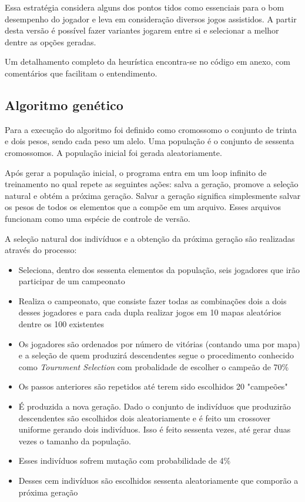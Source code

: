 \documentclass[a4paper,titlepage,11pt]{article}
\begin{document}
Essa estratégia considera alguns dos pontos tidos como essenciais para o bom desempenho do jogador e leva em consideração diversos jogos assistidos. A partir desta versão é possível fazer variantes jogarem entre si e selecionar a melhor dentre as opções geradas.

Um detalhamento completo da heurística encontra-se no código em anexo, com comentários que facilitam o entendimento.

\subsection{Algoritmo genético}
Para a execução do algoritmo foi definido como cromossomo o conjunto de trinta e dois pesos, sendo cada peso um alelo. Uma população é o conjunto de sessenta cromossomos. A população inicial foi gerada aleatoriamente.

Após gerar a população inicial, o programa entra em um loop infinito de treinamento no qual repete as seguintes ações: salva a geração, promove a seleção natural e obtém a próxima geração. Salvar a geração significa simplesmente salvar os pesos de todos os elementos que a compõe em um arquivo. Esses arquivos funcionam como uma espécie de controle de versão.

A seleção natural dos indivíduos e a obtenção da próxima geração são realizadas através do processo:
\begin{itemize}
	\item Seleciona, dentro dos sessenta elementos da população, seis jogadores que irão participar de um campeonato
	\item Realiza o campeonato, que consiste fazer todas as combinações dois a dois desses jogadores e para cada dupla realizar jogos em 10 mapas aleatórios dentre os 100 existentes 
	\item Os jogadores são ordenados por número de vitórias (contando uma por mapa) e a seleção de quem produzirá descendentes segue o procedimento conhecido como {\em Tournment Selection} com probalidade de escolher o campeão de 70\%
	\item Os passos anteriores são repetidos até terem sido escolhidos 20 "campeões"
	\item É produzida a nova geração. Dado o conjunto de indivíduos que produzirão descendentes são escolhidos dois aleatoriamente e é feito um crossover uniforme gerando dois indivíduos. Isso é feito sessenta vezes, até gerar duas vezes o tamanho da população. 
	\item Esses indivíduos sofrem mutação com probabilidade de 4\%
	\item Desses cem indivíduos são escolhidos sessenta aleatoriamente que comporão a próxima geração
\end{itemize}
\end{document}
